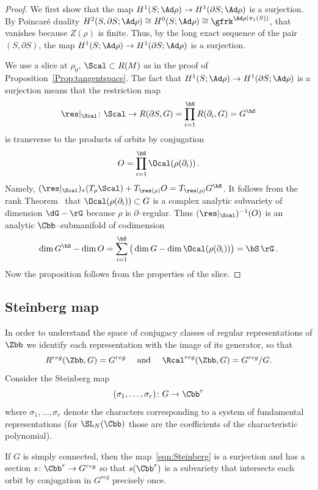 \begin{proof}
We first show that the map $H^1(S;\Ad\rho)\to H^1(\partial S;\Ad\rho)$ is a surjection. By Poincaré duality $H^2(S,\partial S;\Ad\rho) \cong H^0(S;\Ad\rho)\cong \gfrk^{\Ad\rho(\pi_1(S))}$, that vanishes because $Z(\rho)$ is finite. Thus, by the long exact sequence of the pair $(S,\partial S)$, the map $H^1(S;\Ad\rho)\to H^1(\partial S;\Ad\rho)$ is a surjection.


We use a slice at $\rho_0$, $\Scal\subset R(M)$ as in the proof of Proposition~\ref{Prop:tangentspace}. The fact that $H^1(S;\Ad\rho)\to H^1(\partial S;\Ad\rho)$ is a surjection means that the restriction map
\[
\res\vert _\Scal\colon\Scal\to R(\partial S, G)=
\prod_{i=1}^\bS R(\partial_i, G)= G^\bS
\]
is transverse to the products of orbits by conjugation
\[
O=\prod_{i=1}^\bS\Ocal(\rho(\partial_i))\,.
\]
Namely, $(\res\vert_\Scal)_* (T_{\rho}\Scal)+ T_{\res(\rho)} O= T _{\res(\rho)} G^\bS$. It follows from the rank Theorem~\cite[Chapter~4.1]{Loj} that $\Ocal(\rho(\partial_i))\subset G$ is a complex analytic subvariety of dimension $\dG-\rG$ because $\rho$ is $\partial$--regular. Thus $(\res\vert_\Scal)^{-1}(O)$ is an analytic $\Cbb$--submanifold of codimension
\[
\dim G^\bS -\dim O = \sum_{i=1}^\bS \big(\dim G -\dim \Ocal(\rho(\partial_i))\big) =
\bS\, \rG\,.
\]
Now the proposition follows from the properties of the slice.
\end{proof}

\subsection{Steinberg map}\label{subsection:Steinberg}
In order to understand the space of conjugacy classes of regular representations of $\Zbb$ we identify each representation with the image of its generator, so that
\[
R^{reg}(\Zbb,G)= G^{reg}
\quad\text{ and }\quad
\Rcal^{reg}(\Zbb,G)= G^{reg}/G.
\]
Consider the Steinberg map
\begin{equation}\label{eqn:Steinberg}
(\sigma_1,\dots,\sigma_r) \colon G \to \Cbb^r
\end{equation}
where $\sigma_1,\dots,\sigma_r$ denote the characters corresponding to a system of fundamental representations (for $\SL_N (\Cbb)$ those are the coefficients of the characteristic polynomial).


\begin{theo}\label{thm:Steinberg}
If $G$ is simply connected, then the map~\eqref{eqn:Steinberg} is a surjection and has a section $ s\colon \Cbb^r\to G^{reg}$ so that $s(\Cbb^r)$ is a subvariety that intersects each orbit by conjugation in $G^{reg}$ precisely once.
\end{theo}

